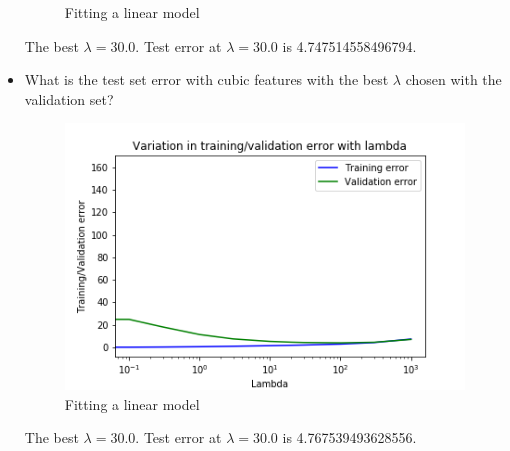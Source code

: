\documentclass{article}
\begin{document}
\begin{itemize}
\begin{figure}[htbp]
	\caption{Fitting a linear model}
\end{figure}
The best $\lambda = 30.0$. Test error at $\lambda = 30.0$ is 4.747514558496794.
\pagebreak
\item What is the test set error with cubic features with the best $\lambda$ chosen with the validation set?\\
\begin{figure}[htbp]
	\centering
	\includegraphics[scale = 0.4]{ex_select_lambda_poly2.png}
	\caption{Fitting a linear model}
\end{figure}
The best $\lambda = 30.0$. Test error at $\lambda = 30.0$ is 4.767539493628556.
\end{itemize}
\end{document}
